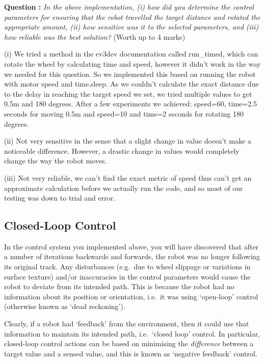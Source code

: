 \documentclass[hidelinks,a4paper,11pt]{article}
\newcounter{question}
\newcommand\myq{\refstepcounter{question}\thequestion}
\begin{document}
	{\bfseries Question \myq:}  \emph{In the above implementation, (i) how did you determine the control parameters for ensuring that the robot travelled the target distance and rotated the appropriate amount, (ii) how sensitive was it to the selected parameters, and (iii) how reliable was the best solution?} (Worth up to 4 marks)\\
	\begin{mdframed}
		(i) We tried a method in the ev3dev documentation called run\_timed, which can rotate the wheel by calculating time and speed, however it didn't work in the way we needed for this question.
		So we implemented this based on running the robot with motor speed and time.sleep. As we couldn't calculate the exact distance due to the delay in reaching the target speed we set, we tried multiple values to get 0.5m and 180 degrees.
		After a few experiments we achieved: speed=60, time=2.5 seconds for moving 0.5m and speed=10 and time=2 seconds for rotating 180 degrees.
		
		(ii) Not very sensitive in the sense that a slight change in value doesn't make a noticeable difference. However, a drastic change in values would completely change the way the robot moves.
		
		(iii) Not very reliable, we can't find the exact metric of speed thus can't get an approximate calculation before we actually run the code, and so most of our testing was down to trial and error.
	\end{mdframed}
	\vspace*{\baselineskip}
	
	
	\subsection{Closed-Loop Control}
	
	In the control system you implemented above, you will have discovered that after a number of iterations backwards and forwards, the robot was no longer following its original track.  Any disturbances (e.g.\ due to wheel slippage or variations in surface texture) and/or inaccuracies in the control parameters would cause the robot to deviate from its intended path.  This is because the robot had no information about its position or orientation, i.e.\ it was using `open-loop' control (otherwise known as `dead reckoning').
	
	Clearly, if a robot had `feedback' from the environment, then it could use that information to maintain its intended path, i.e.\ `closed loop' control.  In particular, closed-loop control actions can be based on minimising the \emph{difference} between a target value and a sensed value, and this is known as `negative feedback' control.
	
\end{document}
